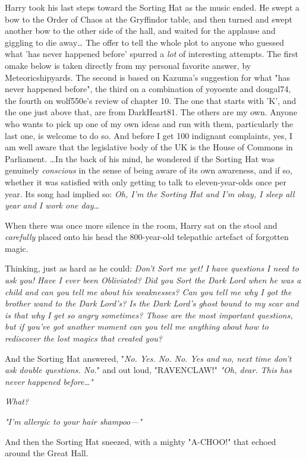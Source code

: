 Harry took his last steps toward the Sorting Hat as the music ended. He swept a bow to the Order of Chaos at the Gryffindor table, and then turned and swept another bow to the other side of the hall, and waited for the applause and giggling to die away{\ldots}
\sbreak
The offer to tell the whole plot to anyone who guessed what 'has never happened before' spurred a \emph{lot} of interesting attempts. The first omake below is taken directly from my personal favorite answer, by Meteoricshipyards. The second is based on Kazuma's suggestion for what "has never happened before", the third on a combination of yoyoente and dougal74, the fourth on wolf550e's review of chapter 10. The one that starts with 'K', and the one just above that, are from DarkHeart81. The others are my own. Anyone who wants to pick up one of my own ideas and run with them, particularly the last one, is welcome to do so. And before I get 100 indignant complaints, yes, I am well aware that the legislative body of the UK is the House of Commons in Parliament.
\sbreak
{\ldots}In the back of his mind, he wondered if the Sorting Hat was genuinely \emph{conscious} in the sense of being aware of its own awareness, and if so, whether it was satisfied with only getting to talk to eleven-year-olds once per year. Its song had implied so: \emph{Oh, I'm the Sorting Hat and I'm okay, I sleep all year and I work one day{\ldots}}

When there was once more silence in the room, Harry sat on the stool and \emph{carefully} placed onto his head the 800-year-old telepathic artefact of forgotten magic.

Thinking, just as hard as he could: \emph{Don't Sort me yet! I have questions I need to ask you! Have I ever been Obliviated? Did you Sort the Dark Lord when he was a child and can you tell me about his weaknesses? Can you tell me why I got the brother wand to the Dark Lord's? Is the Dark Lord's ghost bound to my scar and is that why I get so angry sometimes? Those are the most important questions, but if you've got another moment can you tell me anything about how to rediscover the lost magics that created you?}

And the Sorting Hat answered, "\emph{No. Yes. No. No. Yes and no, next time don't ask double questions. No.}" and out loud, "RAVENCLAW!"
\sbreak
\emph{"Oh, dear. This has never happened before{\ldots}"}

\emph{What?}

\emph{"I'm allergic to your hair shampoo---"}

And then the Sorting Hat sneezed, with a mighty "A-CHOO!" that echoed around the Great Hall.

